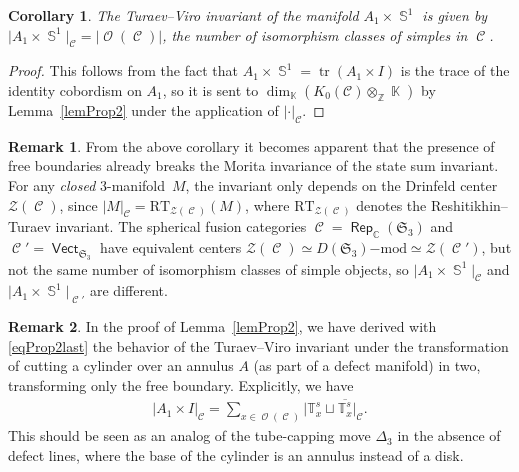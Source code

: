 \documentclass[10pt,a4paper]{amsart}
\DeclareMathOperator{\tr}{tr}
\DeclareMathOperator{\vect}{\mathsf{Vect}}
\DeclareMathOperator{\Rep}{\mathsf{Rep}}
\DeclareMathOperator{\K}{\mathbb{K}}
\DeclareMathOperator{\C}{\mathbb{C}}
\DeclareMathOperator{\Sp}{\mathbb{S}}
\DeclareMathOperator{\calc}{\mathcal{C}}
\DeclareMathOperator{\calo}{\mathcal{O}}
\numberwithin{equation}{section}
\newtheorem{Corollary}[Corollary]{Corollary}
\theoremstyle{definition}
\newtheorem{Remark}[Remark]{Remark}
\begin{document}
\begin{Corollary}\label{corAnn}
The Turaev--Viro invariant of the manifold $A_1 \times \Sp^1$ is given by $\bigl|{A_1 \times \Sp^1}\bigr|_{\calc} = |{\calo}(\calc)|$, the number of isomorphism classes of simples in $\calc$.
\end{Corollary}
\begin{proof}
 This follows from the fact that $A_1 \times \Sp^1 = \tr(A_1 \times I)$ is the trace of the identity cobordism on $A_1$, so it is sent to $\dim_{\K}(K_0(\mathcal{C}) \otimes_{\mathbb{Z}} \K)$ by Lemma~\ref{lemProp2} under the application of $|\cdot|_{\calc}$.
\end{proof}
\begin{Remark}
 From the above corollary it becomes apparent that the presence of free boundaries already breaks the Morita invariance of the state sum invariant. For any \textit{closed} 3-mani\-fold~$M$, the invariant only depends on the Drinfeld center $\mathcal{Z}(\calc)$, since $|M|_{\calc} = \mathrm{RT}_{\mathcal{Z}(\calc)}(M)$, where $\mathrm{RT}_{\mathcal{Z}(\calc)}$ denotes the Reshitikhin--Turaev invariant. The spherical fusion categories $\calc = \Rep_{\C}(\mathfrak{S}_3)$ and $\calc' = \vect_{\mathfrak{S}_3}$ have equivalent centers $\mathcal{Z}(\calc) \simeq D(\mathfrak{S}_3)\mathrm{-mod}\simeq \mathcal{Z}(\calc')$, but not the same number of isomorphism classes of simple objects, so $\bigl|A_1 \times \Sp^1\bigr|_{\calc}$ and $\bigl|A_1 \times \Sp^1\bigr|_{\calc'}$ are different.
\end{Remark}
\begin{Remark}
 In the proof of Lemma~\ref{lemProp2}, we have derived with \eqref{eqProp2last} the behavior of the Turaev--Viro invariant under the transformation of cutting a cylinder over an annulus $A$ (as part of a defect manifold) in two, transforming only the free boundary. Explicitly, we have
 \begin{align}
 \label{eqAnnCut}
 |A_1 \times I|_{\calc} = \sum_{x \in \calo(\calc)} \bigl|\mathbb{T}_x^s \sqcup \overline{\mathbb{T}_x^s}\bigr|_{\calc}.
 \end{align}
 This should be seen as an analog of the tube-capping move $\Delta_3$ in the absence of defect lines, where the base of the cylinder is an annulus instead of a disk.
\end{Remark}
\end{document}
